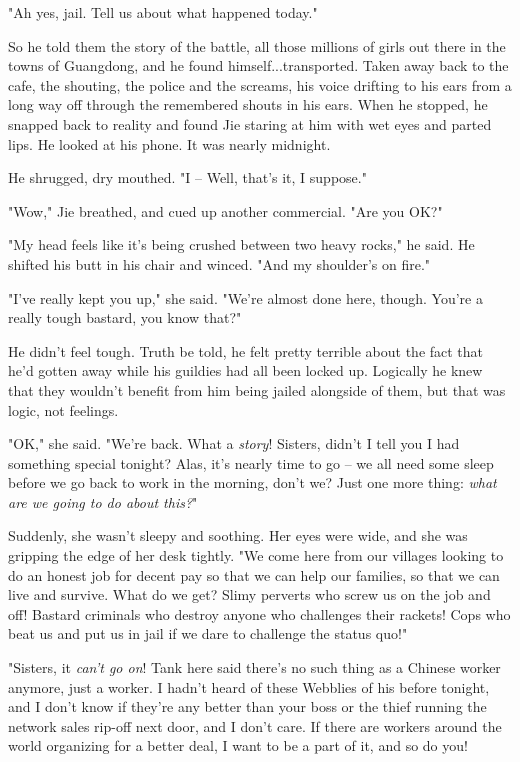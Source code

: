 "Ah yes, jail. Tell us about what happened today."

So he told them the story of the battle, all those millions of
girls out there in the towns of Guangdong, and he found
himself...transported. Taken away back to the cafe, the shouting,
the police and the screams, his voice drifting to his ears from a
long way off through the remembered shouts in his ears. When he
stopped, he snapped back to reality and found Jie staring at him
with wet eyes and parted lips. He looked at his phone. It was
nearly midnight.

He shrugged, dry mouthed. "I -- Well, that's it, I suppose."

"Wow," Jie breathed, and cued up another commercial. "Are you OK?"

"My head feels like it's being crushed between two heavy rocks," he
said. He shifted his butt in his chair and winced. "And my
shoulder's on fire."

"I've really kept you up," she said. "We're almost done here,
though. You're a really tough bastard, you know that?"

He didn't feel tough. Truth be told, he felt pretty terrible about
the fact that he'd gotten away while his guildies had all been
locked up. Logically he knew that they wouldn't benefit from him
being jailed alongside of them, but that was logic, not feelings.

"OK," she said. "We're back. What a \emph{story}! Sisters, didn't I
tell you I had something special tonight? Alas, it's nearly time to
go -- we all need some sleep before we go back to work in the
morning, don't we? Just one more thing:
\emph{what are we going to do about this?}"

Suddenly, she wasn't sleepy and soothing. Her eyes were wide, and
she was gripping the edge of her desk tightly. "We come here from
our villages looking to do an honest job for decent pay so that we
can help our families, so that we can live and survive. What do we
get? Slimy perverts who screw us on the job and off! Bastard
criminals who destroy anyone who challenges their rackets! Cops who
beat us and put us in jail if we dare to challenge the status
quo!"

"Sisters, it \emph{can't go on}! Tank here said there's no such
thing as a Chinese worker anymore, just a worker. I hadn't heard of
these Webblies of his before tonight, and I don't know if they're
any better than your boss or the thief running the network sales
rip-off next door, and I don't care. If there are workers around
the world organizing for a better deal, I want to be a part of it,
and so do you!

